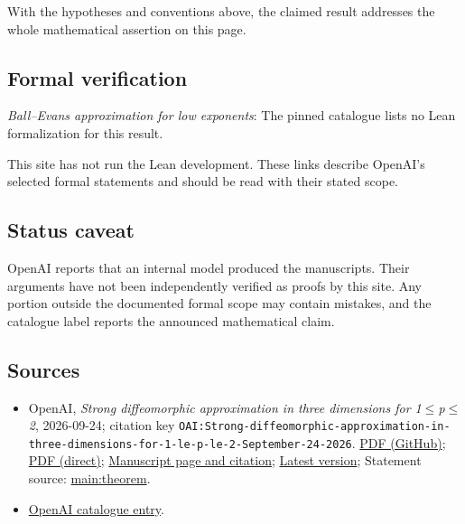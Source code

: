 \documentclass[11pt]{article}
\begin{document}
With the hypotheses and conventions above, the claimed result addresses the whole mathematical assertion on this page.

\subsection{Formal verification}
\textit{Ball--Evans approximation for low exponents}: The pinned catalogue lists no Lean formalization for this result.

This site has not run the Lean development. These links describe OpenAI’s selected formal statements and should be read with their stated scope.

\subsection{Status caveat}
OpenAI reports that an internal model produced the manuscripts. Their arguments have not been independently verified as proofs by this site. Any portion outside the documented formal scope may contain mistakes, and the catalogue label reports the announced mathematical claim.

\subsection{Sources}
\begin{itemize}
\item OpenAI, \emph{Strong diffeomorphic approximation in three dimensions for 1\(\leq\)p\(\leq\)2}, 2026-09-24; citation key \texttt{OAI:Strong-diffeomorphic-approximation-in-three-dimensions-for-1-le-p-le-2-September-24-2026}. \href{https://github.com/openai/math/blob/adc7f1241b42e322a6451854ab7e4b4c146bf78a/preprints/Strong-diffeomorphic-approximation-in-three-dimensions-for-1-le-p-le-2-September-24-2026/main.pdf}{PDF (GitHub)}; \href{https://github.com/openai/math/raw/adc7f1241b42e322a6451854ab7e4b4c146bf78a/preprints/Strong-diffeomorphic-approximation-in-three-dimensions-for-1-le-p-le-2-September-24-2026/main.pdf}{PDF (direct)}; \href{https://github.com/openai/math/blob/adc7f1241b42e322a6451854ab7e4b4c146bf78a/preprints/Strong-diffeomorphic-approximation-in-three-dimensions-for-1-le-p-le-2-September-24-2026/README.md}{Manuscript page and citation}; \href{https://github.com/openai/math/blob/main/preprints/Strong-diffeomorphic-approximation-in-three-dimensions-for-1-le-p-le-2-September-24-2026/main.pdf}{Latest version}; Statement source: \href{https://github.com/openai/math/blob/adc7f1241b42e322a6451854ab7e4b4c146bf78a/preprints/Strong-diffeomorphic-approximation-in-three-dimensions-for-1-le-p-le-2-September-24-2026/build/sections/01-introduction.tex\#L29}{main:theorem}.
\item \href{https://github.com/openai/math/blob/adc7f1241b42e322a6451854ab7e4b4c146bf78a/CONTENTS.md}{OpenAI catalogue entry}.
\end{itemize}
\end{document}
